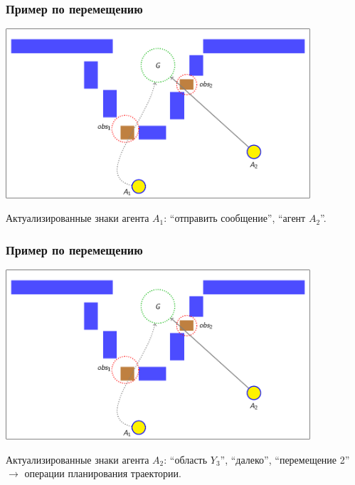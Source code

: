\documentclass[default]{beamer}
\begin{document}
	\begin{frame}
		\frametitle{Пример по перемещению}
		
		\begin{center}
			\includegraphics[page=42,width=0.85\textwidth]{examples/slides_colored}
		\end{center}
		\par\bigskip
		Актуализированные знаки агента $A_1$: ``отправить сообщение'', ``агент $A_2$''.
	\end{frame}
	
	\begin{frame}
		\frametitle{Пример по перемещению}
		
		\begin{center}
			\includegraphics[page=58,width=0.85\textwidth]{examples/slides_colored}
		\end{center}
		\par\bigskip
		Актуализированные знаки агента $A_2$: ``область $Y_3$'', ``далеко'', ``перемещение 2'' $\rightarrow$ \color{green!70!black} операции планирования траектории.
	\end{frame}
	
\end{document}
